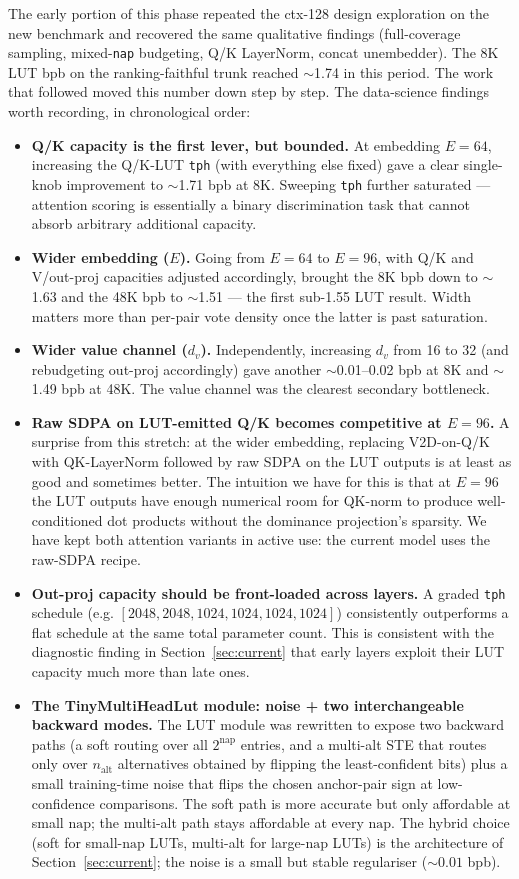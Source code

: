 \documentclass[11pt]{article}
\begin{document}
The early portion of this phase repeated the ctx-128 design exploration on the new benchmark and recovered the same qualitative findings (full-coverage sampling, mixed-\texttt{nap} budgeting, Q/K LayerNorm, concat unembedder).
The 8K LUT bpb on the ranking-faithful trunk reached $\sim$1.74 in this period.
The work that followed moved this number down step by step.
The data-science findings worth recording, in chronological order:
\begin{itemize}
\setlength{\itemsep}{2pt}
    \item \textbf{Q/K capacity is the first lever, but bounded.} At embedding $E = 64$, increasing the Q/K-LUT \texttt{tph} (with everything else fixed) gave a clear single-knob improvement to $\sim$1.71 bpb at 8K. Sweeping \texttt{tph} further saturated --- attention scoring is essentially a binary discrimination task that cannot absorb arbitrary additional capacity.
    \item \textbf{Wider embedding ($E$).} Going from $E = 64$ to $E = 96$, with Q/K and V/out-proj capacities adjusted accordingly, brought the 8K bpb down to $\sim$1.63 and the 48K bpb to $\sim$1.51 --- the first sub-1.55 LUT result. Width matters more than per-pair vote density once the latter is past saturation.
    \item \textbf{Wider value channel ($d_v$).} Independently, increasing $d_v$ from 16 to 32 (and rebudgeting out-proj accordingly) gave another $\sim$0.01--0.02 bpb at 8K and $\sim$1.49 bpb at 48K. The value channel was the clearest secondary bottleneck.
    \item \textbf{Raw SDPA on LUT-emitted Q/K becomes competitive at $E = 96$.} A surprise from this stretch: at the wider embedding, replacing V2D-on-Q/K with QK-LayerNorm followed by raw SDPA on the LUT outputs is at least as good and sometimes better. The intuition we have for this is that at $E = 96$ the LUT outputs have enough numerical room for QK-norm to produce well-conditioned dot products without the dominance projection's sparsity. We have kept both attention variants in active use: the current model uses the raw-SDPA recipe.
    \item \textbf{Out-proj capacity should be front-loaded across layers.} A graded \texttt{tph} schedule (e.g. $[2048, 2048, 1024, 1024, 1024, 1024]$) consistently outperforms a flat schedule at the same total parameter count. This is consistent with the diagnostic finding in Section~\ref{sec:current} that early layers exploit their LUT capacity much more than late ones.
    \item \textbf{The TinyMultiHeadLut module: noise + two interchangeable backward modes.} The LUT module was rewritten to expose two backward paths (a soft routing over all $2^\text{nap}$ entries, and a multi-alt STE that routes only over $n_\text{alt}$ alternatives obtained by flipping the least-confident bits) plus a small training-time noise that flips the chosen anchor-pair sign at low-confidence comparisons. The soft path is more accurate but only affordable at small $\text{nap}$; the multi-alt path stays affordable at every $\text{nap}$. The hybrid choice (soft for small-$\text{nap}$ LUTs, multi-alt for large-$\text{nap}$ LUTs) is the architecture of Section~\ref{sec:current}; the noise is a small but stable regulariser ($\sim$$0.01$ bpb).
$$
\end{itemize}
\end{document}
